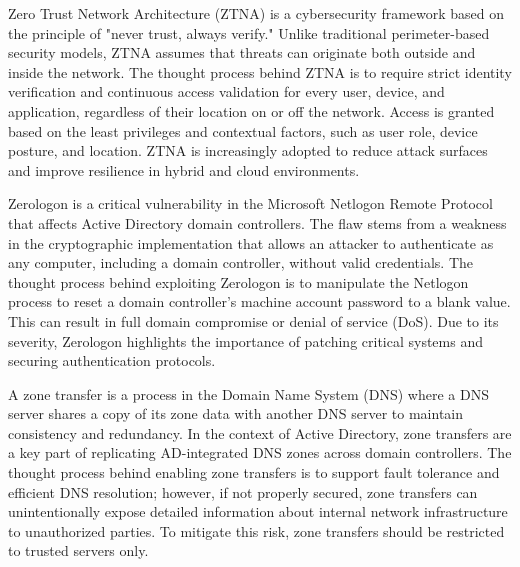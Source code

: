  Zero Trust Network Architecture (ZTNA) is a cybersecurity framework based on the principle of "never trust, always verify." Unlike traditional perimeter-based security models, ZTNA assumes that threats can originate both outside and inside the network. The thought process behind ZTNA is to require strict identity verification and continuous access validation for every user, device, and application, regardless of their location on or off the network. Access is granted based on the least privileges and contextual factors, such as user role, device posture, and location. ZTNA is increasingly adopted to reduce attack surfaces and improve resilience in hybrid and cloud environments.

 Zerologon is a critical vulnerability in the Microsoft Netlogon Remote Protocol that affects Active Directory domain controllers. The flaw stems from a weakness in the cryptographic implementation that allows an attacker to authenticate as any computer, including a domain controller, without valid credentials. The thought process behind exploiting Zerologon is to manipulate the Netlogon process to reset a domain controller’s machine account password to a blank value. This can result in full domain compromise or denial of service (DoS). Due to its severity, Zerologon highlights the importance of patching critical systems and securing authentication protocols.

 A zone transfer is a process in the Domain Name System (DNS) where a DNS server shares a copy of its zone data with another DNS server to maintain consistency and redundancy. In the context of Active Directory, zone transfers are a key part of replicating AD-integrated DNS zones across domain controllers. The thought process behind enabling zone transfers is to support fault tolerance and efficient DNS resolution; however, if not properly secured, zone transfers can unintentionally expose detailed information about internal network infrastructure to unauthorized parties. To mitigate this risk, zone transfers should be restricted to trusted servers only.
